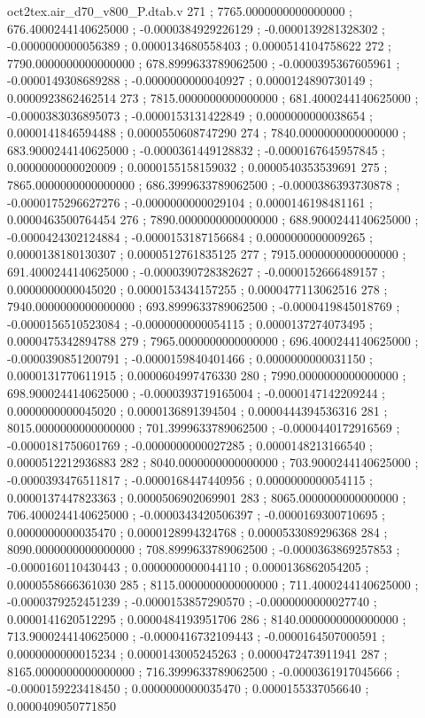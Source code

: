 \begin{filecontents}[overwrite]{oct2tex.air_d70_v800_P.dtab.v}
271 ; 7765.0000000000000000 ; 676.4000244140625000 ; -0.0000384929226129 ; -0.0000139281328302 ; -0.0000000000056389 ; 0.0000134680558403 ; 0.0000514104758622
272 ; 7790.0000000000000000 ; 678.8999633789062500 ; -0.0000395367605961 ; -0.0000149308689288 ; -0.0000000000040927 ; 0.0000124890730149 ; 0.0000923862462514
273 ; 7815.0000000000000000 ; 681.4000244140625000 ; -0.0000383036895073 ; -0.0000153131422849 ; 0.0000000000038654 ; 0.0000141846594488 ; 0.0000550608747290
274 ; 7840.0000000000000000 ; 683.9000244140625000 ; -0.0000361449128832 ; -0.0000167645957845 ; 0.0000000000020009 ; 0.0000155158159032 ; 0.0000540353539691
275 ; 7865.0000000000000000 ; 686.3999633789062500 ; -0.0000386393730878 ; -0.0000175296627276 ; -0.0000000000029104 ; 0.0000146198481161 ; 0.0000463500764454
276 ; 7890.0000000000000000 ; 688.9000244140625000 ; -0.0000424302124884 ; -0.0000153187156684 ; 0.0000000000009265 ; 0.0000138180130307 ; 0.0000512761835125
277 ; 7915.0000000000000000 ; 691.4000244140625000 ; -0.0000390728382627 ; -0.0000152666489157 ; 0.0000000000045020 ; 0.0000153434157255 ; 0.0000477113062516
278 ; 7940.0000000000000000 ; 693.8999633789062500 ; -0.0000419845018769 ; -0.0000156510523084 ; -0.0000000000054115 ; 0.0000137274073495 ; 0.0000475342894788
279 ; 7965.0000000000000000 ; 696.4000244140625000 ; -0.0000390851200791 ; -0.0000159840401466 ; 0.0000000000031150 ; 0.0000131770611915 ; 0.0000604997476330
280 ; 7990.0000000000000000 ; 698.9000244140625000 ; -0.0000393719165004 ; -0.0000147142209244 ; 0.0000000000045020 ; 0.0000136891394504 ; 0.0000444394536316
281 ; 8015.0000000000000000 ; 701.3999633789062500 ; -0.0000440172916569 ; -0.0000181750601769 ; -0.0000000000027285 ; 0.0000148213166540 ; 0.0000512212936883
282 ; 8040.0000000000000000 ; 703.9000244140625000 ; -0.0000393476511817 ; -0.0000168447440956 ; 0.0000000000054115 ; 0.0000137447823363 ; 0.0000506902069901
283 ; 8065.0000000000000000 ; 706.4000244140625000 ; -0.0000343420506397 ; -0.0000169300710695 ; 0.0000000000035470 ; 0.0000128994324768 ; 0.0000533089296368
284 ; 8090.0000000000000000 ; 708.8999633789062500 ; -0.0000363869257853 ; -0.0000160110430443 ; 0.0000000000044110 ; 0.0000136862054205 ; 0.0000558666361030
285 ; 8115.0000000000000000 ; 711.4000244140625000 ; -0.0000379252451239 ; -0.0000153857290570 ; -0.0000000000027740 ; 0.0000141620512295 ; 0.0000484193951706
286 ; 8140.0000000000000000 ; 713.9000244140625000 ; -0.0000416732109443 ; -0.0000164507000591 ; 0.0000000000015234 ; 0.0000143005245263 ; 0.0000472473911941
287 ; 8165.0000000000000000 ; 716.3999633789062500 ; -0.0000361917045666 ; -0.0000159223418450 ; 0.0000000000035470 ; 0.0000155337056640 ; 0.0000409050771850

\end{filecontents}
